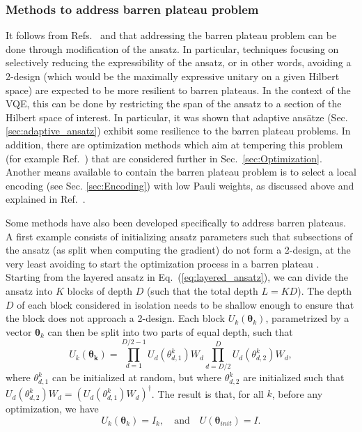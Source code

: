 \subsubsection{Methods to address barren plateau problem} \label{sec:bp_mitigation}

It follows from Refs.~\cite{McClean2018} and \cite{Holmes2021} that addressing the barren plateau problem can be done through modification of the ansatz. In particular, techniques focusing on selectively reducing the expressibility of the ansatz, or in other words, avoiding a 2-design (which would be the maximally expressive unitary on a given Hilbert space) are expected to be more resilient to barren plateaus. In the context of the VQE, this can be done by restricting the span of the ansatz to a section of the Hilbert space of interest. In particular, it was shown that adaptive ans{\"{a}}tze (Sec. \ref{sec:adaptive_ansatz}) exhibit some resilience to the barren plateau problems. In addition, there are optimization methods which aim at tempering this problem (for example Ref.~\cite{haug_optimal_2021}) that are considered further in Sec.~\ref{sec:Optimization}. Another means available to contain the barren plateau problem is to select a local encoding (see Sec. \ref{sec:Encoding}) with low Pauli weights, as discussed above and explained in Ref.~\cite{Cerezo2021_BP}.

Some methods have also been developed specifically to address barren plateaus. A first example consists of initializing ansatz parameters such that subsections of the ansatz (as split when computing the gradient) do not form a 2-design, at the very least avoiding to start the optimization process in a barren plateau \cite{Grant2019}. Starting from the layered ansatz in Eq.~(\ref{eq:layered_ansatz}), we can divide the ansatz into $K$ blocks of depth $D$ (such that the total depth $L = KD$). The depth $D$ of each block considered in isolation needs to be shallow enough to ensure that the block does not approach a 2-design. Each block $U_k(\boldsymbol{\theta}_k)$, parametrized by a vector $\boldsymbol{\theta}_k$ can then be split into two parts of equal depth, such that
\begin{equation}
    U_k(\boldsymbol{\theta_k}) = \prod_{d=1}^{D/2 - 1} U_d(\theta^k_{d, 1}) W_d \prod_{d=D/2}^{D} U_d(\theta^k_{d, 2}) W_d,
\end{equation}
where $\theta^k_{d, 1}$ can be initialized at random, but where $\theta^k_{d, 2}$ are initialized such that $U_d(\theta^k_{d, 2}) W_d  = (U_d(\theta^k_{d, 1}) W_d)^{\dagger}$. The result is that, for all $k$, before any optimization, we have
\begin{equation}
    U_k(\boldsymbol{\theta}_k) = I_k, \quad  \mathrm{and} \quad U(\boldsymbol{\theta}_{init}) = I.
\end{equation}

